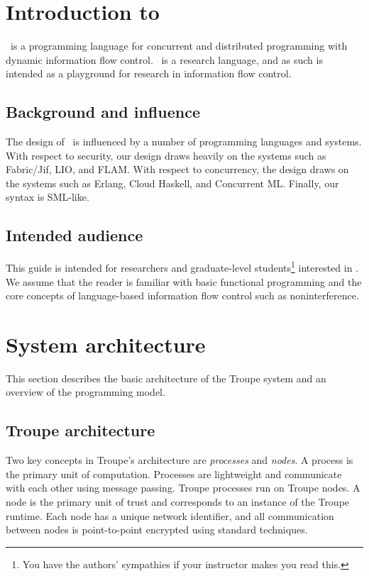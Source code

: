 \section{Introduction to \troupelang}
\troupelang\ is a programming language for concurrent and distributed programming with
dynamic information flow control.
\troupelang\ is a research language, and as such is intended as a playground for research in
information flow control.


\subsection{Background and influence}
The design of \troupelang\ is influenced by a number of programming languages and systems. With respect to
security, our design draws heavily on the systems such as Fabric/Jif, LIO, and FLAM.
With respect to concurrency, the design draws on the systems such as Erlang, Cloud Haskell, and Concurrent ML.
Finally, our syntax is SML-like.


\subsection{Intended audience}
This guide is intended for researchers and graduate-level students\footnote{You have the authors' sympathies if your instructor makes you read this.} interested in \troupelang.
We assume that the reader is familiar with basic functional programming and the
core concepts of language-based information flow control such as noninterference.


\section{System architecture}
\label{sec:design}
This section describes the basic architecture of the Troupe system
and an overview of the programming model.


\subsection{Troupe architecture}
Two key concepts in Troupe's architecture are \emph{processes} and \emph{nodes}. A process is the primary unit of computation. Processes are lightweight and communicate with each other using message passing. Troupe processes run on Troupe nodes. A node is the primary unit of trust and corresponds to an instance of the Troupe runtime. Each node has a unique network identifier, and all communication between nodes is point-to-point encrypted using standard techniques.

